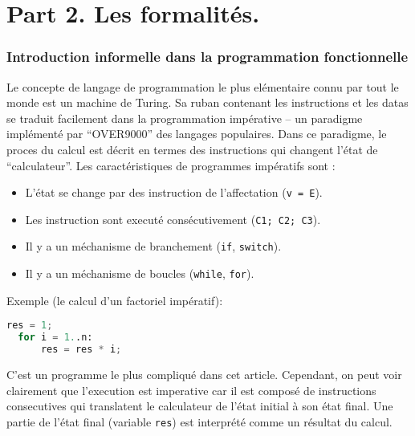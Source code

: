\documentclass[12pt, a4paper]{article}
\begin{document}
\section*{Part 2. Les formalités.}

\subsubsection*{Introduction informelle dans la programmation fonctionnelle}
Le concepte de langage de programmation le plus elémentaire connu par tout le monde est un machine de Turing.
Sa ruban contenant les instructions et les datas se traduit facilement dans la programmation impérative -- un paradigme implémenté par ``OVER9000'' des langages populaires.
Dans ce paradigme, le proces du calcul est décrit en termes des instructions qui changent l'état de ``calculateur''.
Les caractéristiques de programmes impératifs sont :
\begin{itemize}
	\item L'état se change par des instruction de l'affectation (\verb|v = E|).
	\item Les instruction sont executé consécutivement (\verb|C1; C2; C3|).
	\item Il y a un méchanisme de branchement (\verb|if|, \verb|switch|).
	\item Il y a un méchanisme de boucles (\verb|while|, \verb|for|).
\end{itemize}
Exemple (le calcul d'un factoriel impératif):
\begin{lstlisting}[language=Python]
  res = 1;
  for i = 1..n:
      res = res * i;
\end{lstlisting}
C'est un programme le plus compliqué dans cet article.
Cependant, on peut voir clairement que l'execution est imperative car il est composé de instructions consecutives qui translatent le calculateur de l'état initial à son état final.
Une partie de l'état final (variable \verb|res|) est interprété comme un résultat du calcul.
\end{document}
